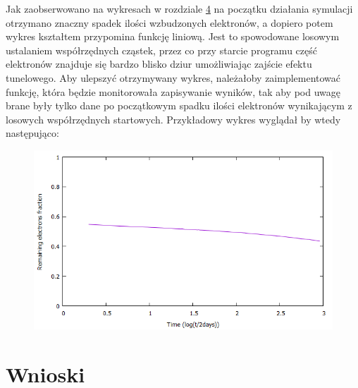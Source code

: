 Jak zaobserwowano na wykresach w rozdziale \hyperref[wynik:wykres]{4} na początku działania symulacji otrzymano znaczny spadek ilości wzbudzonych elektronów, a dopiero potem wykres kształtem przypomina funkcję liniową. Jest to spowodowane losowym ustalaniem współrzędnych cząstek, przez co przy starcie programu część elektronów znajduje się bardzo blisko dziur umożliwiając zajście efektu tunelowego. Aby ulepszyć otrzymywany wykres, należałoby zaimplementować funkcję, która będzie monitorowała zapisywanie wyników, tak aby pod uwagę brane były tylko dane po początkowym spadku ilości elektronów wynikającym z losowych współrzędnych startowych. Przykładowy wykres wyglądał by wtedy następująco:
\begin{figure}[h]
\centering
\includegraphics[width=17cm]{przyklad_ulepszony}
\end{figure}
\section{Wnioski}
